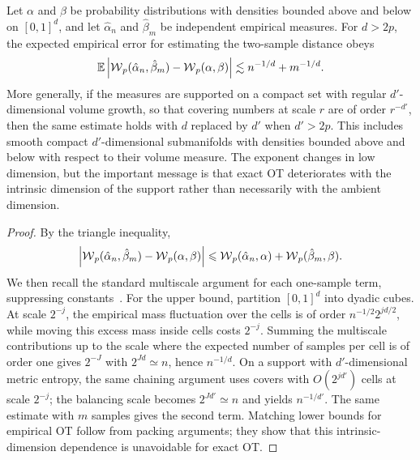 \begin{prop}\label{prop-empirical-ot-rate}
	Let $\alpha$ and $\beta$ be probability distributions with densities bounded above and below on $[0,1]^d$, and let $\hat\alpha_n$ and $\hat\beta_m$ be independent empirical measures. For $d>2p$, the expected empirical error for estimating the two-sample distance obeys
	\[
		\mathbb{E}\left\lvert\operatorname{\mathcal{W}}_p(\hat\alpha_n,\hat\beta_m)-\operatorname{\mathcal{W}}_p(\alpha,\beta)\right\rvert
		\lesssim
		n^{-1/d}+m^{-1/d}.
	\]
	More generally, if the measures are supported on a compact set with regular $d'$-dimensional volume growth, so that covering numbers at scale $r$ are of order $r^{-d'}$, then the same estimate holds with $d$ replaced by $d'$ when $d'>2p$. This includes smooth compact $d'$-dimensional submanifolds with densities bounded above and below with respect to their volume measure. The exponent changes in low dimension, but the important message is that exact OT deteriorates with the intrinsic dimension of the support rather than necessarily with the ambient dimension.
\end{prop}

\begin{proof}
	By the triangle inequality,
	\[
		\left\lvert\operatorname{\mathcal{W}}_p(\hat\alpha_n,\hat\beta_m)-\operatorname{\mathcal{W}}_p(\alpha,\beta)\right\rvert
		\leqslant
		\operatorname{\mathcal{W}}_p(\hat\alpha_n,\alpha)+\operatorname{\mathcal{W}}_p(\hat\beta_m,\beta).
	\]
	We then recall the standard multiscale argument for each one-sample term, suppressing constants~\cite{dudley1969speed,fournier2015rate,weed2017sharp}. For the upper bound, partition $[0,1]^d$ into dyadic cubes. At scale $2^{-j}$, the empirical mass fluctuation over the cells is of order $n^{-1/2}2^{jd/2}$, while moving this excess mass inside cells costs $2^{-j}$. Summing the multiscale contributions up to the scale where the expected number of samples per cell is of order one gives $2^{-J}$ with $2^{Jd}\simeq n$, hence $n^{-1/d}$. On a support with $d'$-dimensional metric entropy, the same chaining argument uses covers with $O(2^{jd'})$ cells at scale $2^{-j}$; the balancing scale becomes $2^{Jd'}\simeq n$ and yields $n^{-1/d'}$. The same estimate with $m$ samples gives the second term. Matching lower bounds for empirical OT follow from packing arguments; they show that this intrinsic-dimension dependence is unavoidable for exact OT.
\end{proof}

